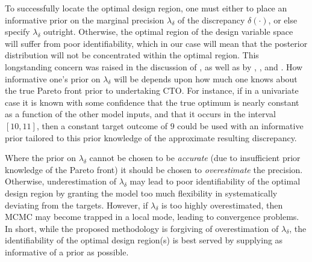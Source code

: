 \documentclass[12pt]{article}
\begin{document}
%
To successfully locate the optimal design region, one must either to place an informative prior on the marginal precision $\lambda_\delta$ of the discrepancy $\delta(\cdot)$, or else specify $\lambda_\delta$ outright. 
%
Otherwise, the optimal region of the design variable space will suffer from poor identifiability, which in our case will mean that the posterior distribution will not be concentrated within the optimal region.
%
This longstanding concern was raised in the discussion of \cite{Kennedy2001}, as well as by \cite{Bayarri2007}, \cite{Tuo2015}, and \cite{Plumlee2017}.
%
How informative one's prior on $\lambda_\delta$ will be depends upon how much one knows about the true Pareto front prior to undertaking CTO.
%
For instance, if in a univariate case it is known with some confidence that the true optimum is nearly constant as a function of the other model inputs, and that it occurs in the interval $[10,11]$, then a constant target outcome of $9$ could be used with an informative prior tailored to this prior knowledge of the approximate resulting discrepancy.
%

Where the prior on $\lambda_\delta$ cannot be chosen to be \emph{accurate} (due to insufficient prior knowledge of the Pareto front) it should be chosen to \emph{overestimate} the precision.
%
Otherwise, underestimation of $\lambda_\delta$ may lead to poor identifiability of the optimal design region by granting the model too much flexibility in systematically deviating from the targets.
%
%
%
%
%
However, if $\lambda_\delta$ is too highly overestimated, then MCMC may become trapped in a local mode, leading to convergence problems. 
%
In short, while the proposed methodology is forgiving of overestimation of $\lambda_\delta$, the identifiability of the optimal design region(s) is best served by supplying as informative of a prior as possible. 
\end{document}
